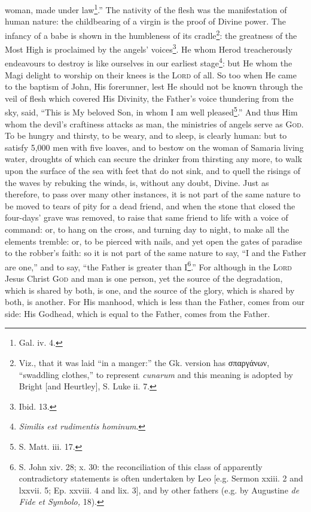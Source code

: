 woman, made under law\footnote{Gal. iv. 4.}.” The nativity of the flesh was the manifestation of human nature: the childbearing of a virgin is the proof of Divine power. The infancy of a babe is shown in the humbleness of its cradle\footnote{Viz., that it was laid “in a manger:” the Gk. version has \textgreek{σπαργάνων}, “swaddling clothes,” to represent \emph{cunarum} and this meaning is adopted by Bright [and Heurtley], S. Luke ii. 7.}: the greatness of the Most High is proclaimed by the angels’ voices\footnote{Ibid. 13.}. He whom Herod treacherously endeavours to destroy is like ourselves in our earliest stage\footnote{\emph{Similis est rudimentis hominum}.}: but He whom the Magi delight to worship on their knees is the \textsc{Lord} of all. So too when He came to the baptism of John, His forerunner, lest He should not be known through the veil of flesh which covered His Divinity, the Father’s voice thundering from the sky, said, “This is My beloved Son, in whom I am well pleased\footnote{S. Matt. iii. 17.}.” And thus Him whom the devil’s craftiness attacks as man, the ministries of angels serve as \textsc{God}. To be hungry and thirsty, to be weary, and to sleep, is clearly human: but to satisfy 5,000 men with five loaves, and to bestow on the woman of Samaria living water, droughts of which can secure the drinker from thirsting any more, to walk upon the surface of the sea with feet that do not sink, and to quell the risings of the waves by rebuking the winds, is, without any doubt, Divine. Just as therefore, to pass over many other instances, it is not part of the same nature to be moved to tears of pity for a dead friend, and when the stone that closed the four-days’ grave was removed, to raise that same friend to life with a voice of command: or, to hang on the cross, and turning day to night, to make all the elements tremble: or, to be pierced with nails, and yet open the gates of paradise to the robber’s faith: so it is not part of the same nature to say, “I and the Father are one,” and to say, “the Father is greater than I\footnote{S. John xiv. 28; x. 30: the reconciliation of this class of apparently contradictory statements is often undertaken by Leo [e.g. Sermon xxiii. 2 and lxxvii. 5; Ep. xxviii. 4 and lix. 3], and by other fathers (e.g. by Augustine \emph{de Fide et Symbolo,} 18).}.” For although in the \textsc{Lord} Jesus Christ \textsc{God} and man is one person, yet the source of the degradation, which is shared by both, is one, and the source of the glory, which is shared by both, is another. For His manhood, which is less than the Father, comes from our side: His Godhead, which is equal to the Father, comes from the Father.

